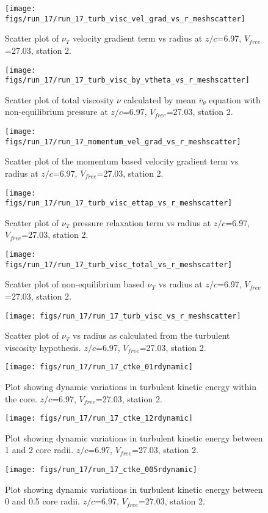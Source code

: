 \begin{figure}[H]
\centering
\texttt{[image: figs/run\_17/run\_17\_turb\_visc\_vel\_grad\_vs\_r\_meshscatter]}
\caption{Scatter plot of $\nu_T$ velocity gradient term vs radius at $z/c$=6.97, $V_{free}$=27.03, station 2.}
\end{figure}


\begin{figure}[H]
\centering
\texttt{[image: figs/run\_17/run\_17\_turb\_visc\_by\_vtheta\_vs\_r\_meshscatter]}
\caption{Scatter plot of total viscosity $\nu$ calculated by mean $\bar{v}_{\theta}$ equation with non-equilibrium pressure at $z/c$=6.97, $V_{free}$=27.03, station 2.}
\end{figure}


\begin{figure}[H]
\centering
\texttt{[image: figs/run\_17/run\_17\_momentum\_vel\_grad\_vs\_r\_meshscatter]}
\caption{Scatter plot of the momentum based velocity gradient term vs radius at $z/c$=6.97, $V_{free}$=27.03, station 2.}
\end{figure}


\begin{figure}[H]
\centering
\texttt{[image: figs/run\_17/run\_17\_turb\_visc\_ettap\_vs\_r\_meshscatter]}
\caption{Scatter plot of $\nu_T$ pressure relaxation term vs radius at $z/c$=6.97, $V_{free}$=27.03, station 2.}
\end{figure}


\begin{figure}[H]
\centering
\texttt{[image: figs/run\_17/run\_17\_turb\_visc\_total\_vs\_r\_meshscatter]}
\caption{Scatter plot of non-equilibrium based $\nu_T$ vs radius at $z/c$=6.97, $V_{free}$=27.03, station 2.}
\end{figure}


\begin{figure}[H]
\centering
\texttt{[image: figs/run\_17/run\_17\_turb\_visc\_vs\_r\_meshscatter]}
\caption{Scatter plot of $\nu_T$ vs radius as calculated from the turbulent viscosity hypothesis. $z/c$=6.97, $V_{free}$=27.03, station 2.}
\end{figure}


\begin{figure}[H]
\centering
\texttt{[image: figs/run\_17/run\_17\_ctke\_01rdynamic]}
\caption{Plot showing dynamic variations in turbulent kinetic energy within the core. $z/c$=6.97, $V_{free}$=27.03, station 2.}
\end{figure}


\begin{figure}[H]
\centering
\texttt{[image: figs/run\_17/run\_17\_ctke\_12rdynamic]}
\caption{Plot showing dynamic variations in turbulent kinetic energy between 1 and 2 core radii. $z/c$=6.97, $V_{free}$=27.03, station 2.}
\end{figure}


\begin{figure}[H]
\centering
\texttt{[image: figs/run\_17/run\_17\_ctke\_005rdynamic]}
\caption{Plot showing dynamic variations in turbulent kinetic energy between 0 and 0.5 core radii. $z/c$=6.97, $V_{free}$=27.03, station 2.}
\end{figure}


